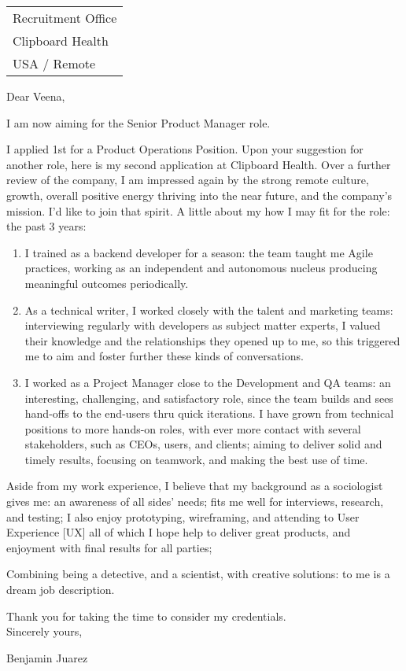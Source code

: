 \hfill%
\bigskip %

\begin{tabular}{@{} l}
    Recruitment Office \\ %
    Clipboard Health     \\ 
    USA / Remote 
\end{tabular}

\bigskip 

Dear Veena,

I am now aiming for the Senior Product Manager role.

I applied 1st %
for a Product Operations Position.
Upon your suggestion for another role,
here is my second application at Clipboard Health.
% 
Over a further review of the company, I am impressed again by the
strong remote culture, growth, overall positive energy thriving into the
near future, and the company's mission. I'd like to join that spirit.
% 
A little about my 
how I may fit for the role:
the 
past 3 years:

\begin{enumerate}
\item 
I trained as a backend developer for a season: 
the team taught me Agile practices, working as an independent
and autonomous nucleus producing meaningful outcomes periodically.
\item 
As a technical writer, I worked closely with the talent and
marketing teams: interviewing regularly with developers as subject
matter experts, I valued their knowledge and the relationships they
opened up to me, so this triggered me to aim and foster further these
kinds of conversations.
\item 
I worked as a Project Manager close to the
Development and QA teams: 
an interesting, challenging, and satisfactory role, 
since the team builds and sees hand-offs to the end-users thru quick iterations. 
I have grown from technical positions to more hands-on
roles, with ever more contact with several stakeholders, such as CEOs,
users, and clients; aiming to deliver solid and timely results, focusing
on teamwork, and making the best use of time.
\end{enumerate}

Aside from my work experience, 
I believe that my background as a sociologist gives me:
% 
  an awareness of all sides' needs;
  fits me well for interviews, research, and testing;
  I also enjoy prototyping, wireframing, and attending to User
  Experience {[}UX{]} all of which I hope help to deliver great
  products, and enjoyment with final results for all parties;

Combining being a detective, and a scientist, with creative solutions:
  to me is a dream job description.

\vspace{-\topsep}

Thank you for taking the time to consider my credentials.\\
Sincerely yours,

Benjamin Juarez
